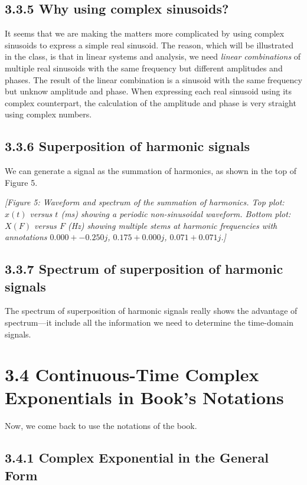 \documentclass[11pt]{article}
\begin{document}
\subsection*{3.3.5 Why using complex sinusoids?}

It seems that we are making the matters more complicated by using complex sinusoids to express a simple real sinusoid. The reason, which will be illustrated in the class, is that in linear systems and analysis, we need \textit{linear combinations} of multiple real sinusoids with the same frequency but different amplitudes and phases. The result of the linear combination is a sinusoid with the same frequency but unknow amplitude and phase. When expressing each real sinusoid using its complex counterpart, the calculation of the amplitude and phase is very straight using complex numbers.

\subsection*{3.3.6 Superposition of harmonic signals}

We can generate a signal as the summation of harmonics, as shown in the top of Figure 5.

\textit{[Figure 5: Waveform and spectrum of the summation of harmonics. Top plot: $x(t)$ versus $t$ (ms) showing a periodic non-sinusoidal waveform. Bottom plot: $X(F)$ versus $F$ (Hz) showing multiple stems at harmonic frequencies with annotations $0.000 + -0.250j$, $0.175 + 0.000j$, $0.071 + 0.071j$.]}

\subsection*{3.3.7 Spectrum of superposition of harmonic signals}

The spectrum of superposition of harmonic signals really shows the advantage of spectrum—it include all the information we need to determine the time-domain signals.

\section*{3.4 Continuous-Time Complex Exponentials in Book's Notations}

Now, we come back to use the notations of the book.

\subsection*{3.4.1 Complex Exponential in the General Form}
\end{document}
